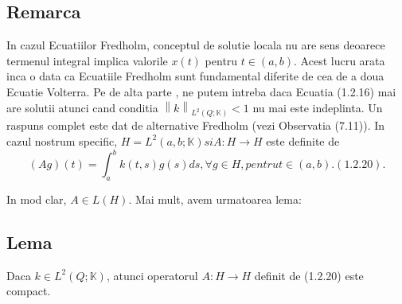 \documentclass[a4paper,12pt,oneside]{report}
\begin{document}
	\subsection{Remarca}
	In cazul Ecuatiilor Fredholm, conceptul de solutie locala nu are sens deoarece termenul integral implica valorile \(x\left ( t \right )\) pentru \(t\in \left ( a,b \right )\). Acest lucru arata inca o data ca Ecuatiile Fredholm sunt fundamental diferite de cea de a doua Ecuatie Volterra. 
	Pe de alta parte , ne putem intreba daca Ecuatia (1.2.16) mai are solutii atunci cand conditia \(\left \| k \right \|_{L^{2}\left ( Q;\mathbb{K} \right )}< 1\) nu mai este indeplinta. Un raspuns complet este dat de alternative Fredholm (vezi Observatia (7.11)). In cazul nostrum specific, \(H = L^{2}\left ( a,b;\mathbb{K} \right ) si A : H \rightarrow H\) este definite de
	\begin{displaymath}
		\left ( Ag \right )\left ( t \right ) = \int_{a}^{b}k\left ( t,s \right )g\left ( s \right )ds, \forall g\in H, pentru t\in \left ( a,b \right ). (1.2.20). 
	\end{displaymath}
					
	In mod clar, \(A \in L\left ( H \right )\). Mai mult, avem urmatoarea lema: 
					
	\subsection{Lema}
	Daca \(k\in L^{2}\left ( Q;\mathbb{K} \right )\), atunci operatorul \(A : H \rightarrow H\) definit de (1.2.20) este compact. 
					
\end{document}
